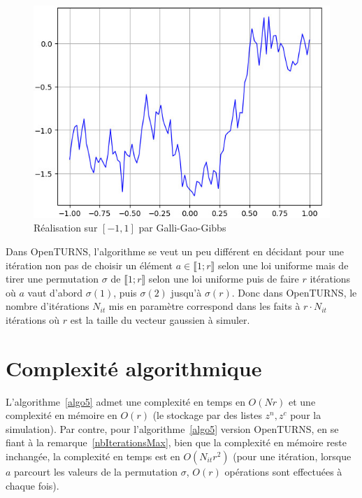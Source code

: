 \begin{figure}[h]
\begin{center}
\includegraphics[scale=0.7]{images/gibbsRea.jpg}
\caption{Réalisation sur $[-1,1]$ par Galli-Gao-Gibbs}
\label{figGibbsRea}  
\end{center}
\end{figure}

\begin{remark}
  \label{nbIterationsMax}
  Dans OpenTURNS, l'algorithme se veut un peu différent en décidant pour une itération non pas de choisir un
  élément $a \in \llbracket 1;r \rrbracket $ selon une loi uniforme mais de tirer une permutation $\sigma$ de
  $\llbracket 1;r \rrbracket$ selon une loi uniforme puis de faire $r$ itérations où $a$ vaut d'abord $\sigma(1)$,
  puis $\sigma(2)$ jusqu'à $\sigma(r)$. Donc dans OpenTURNS, le nombre d'itérations $N_{it}$ mis en paramètre
  correspond dans les faits à $r \cdot N_{it} $ itérations où $r$ est la taille du vecteur gaussien à simuler.
\end{remark}

\section{Complexité algorithmique}
L'algorithme~\ref{algo5} admet une complexité en temps en
$O(Nr)$ et une complexité en mémoire en $O(r)$
(le stockage par des listes $z^n, z^c$ pour la simulation). Par
contre, pour l'algorithme~\ref{algo5} version OpenTURNS, en se fiant à la
remarque~\ref{nbIterationsMax}, bien que la complexité en mémoire reste inchangée,
la complexité en temps est en $O(N_{it}r^2)$ (pour une itération, lorsque $a$ parcourt
les valeurs de la permutation $\sigma$, $O(r)$ opérations
sont effectuées à chaque fois).


